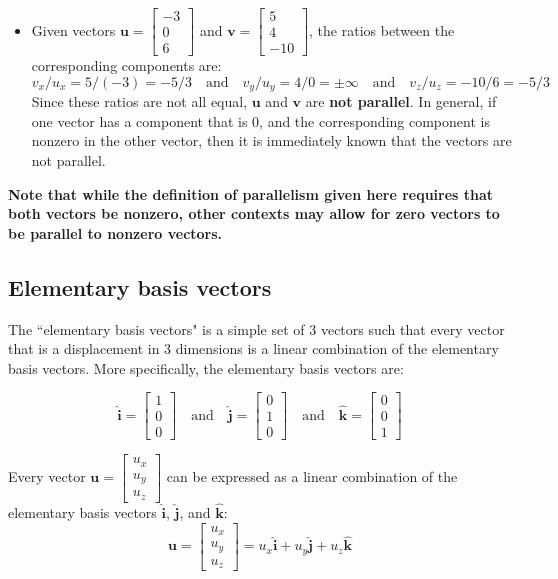 \documentclass{article}
\begin{document}
\begin{itemize}
\item Given vectors \(\mathbf{u} = \begin{bmatrix} -3 \\ 0 \\ 6 \end{bmatrix}\) and \(\mathbf{v} = \begin{bmatrix} 5 \\ 4 \\ -10 \end{bmatrix}\), the ratios between the corresponding components are:
\[v_x/u_x = 5/(-3) = -5/3 \quad\text{and}\quad v_y/u_y = 4/0 = \pm\infty \quad\text{and}\quad v_z/u_z = -10/6 = -5/3\]
Since these ratios are not all equal, \(\mathbf{u}\) and \(\mathbf{v}\) are {\bf not parallel}. In general, if one vector has a component that is \(0\), and the corresponding component is nonzero in the other vector, then it is immediately known that the vectors are not parallel.
\end{itemize}

{\bf Note that while the definition of parallelism given here requires that both vectors be nonzero, other contexts may allow for zero vectors to be parallel to nonzero vectors.}


\subsection*{Elementary basis vectors}

The ``elementary basis vectors" is a simple set of \(3\) vectors such that every vector that is a displacement in \(3\) dimensions is a linear combination of the elementary basis vectors. More specifically, the elementary basis vectors are:

\[\hat{\mathbf{i}} = \begin{bmatrix} 1 \\ 0 \\ 0 \end{bmatrix} \quad\text{and}\quad \hat{\mathbf{j}} = \begin{bmatrix} 0 \\ 1 \\ 0 \end{bmatrix} \quad\text{and}\quad \hat{\mathbf{k}} = \begin{bmatrix} 0 \\ 0\\ 1 \end{bmatrix}\]

Every vector \(\mathbf{u} = \begin{bmatrix} u_x \\ u_y \\ u_z \end{bmatrix}\) can be expressed as a linear combination of the elementary basis vectors \(\hat{\mathbf{i}}\), \(\hat{\mathbf{j}}\), and \(\hat{\mathbf{k}}\):
\[\mathbf{u} = \begin{bmatrix} u_x \\ u_y \\ u_z \end{bmatrix} = u_x \hat{\mathbf{i}} + u_y \hat{\mathbf{j}} + u_z \hat{\mathbf{k}}\]
\end{document}
